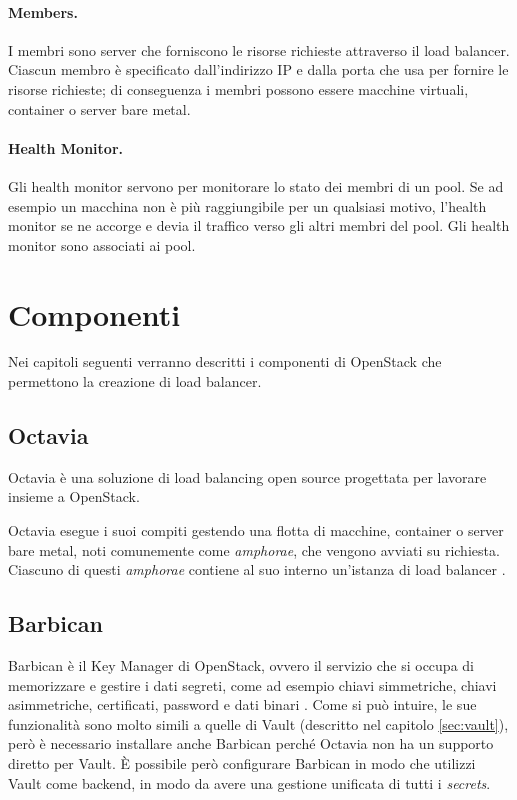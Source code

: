 \paragraph{Members.} I membri sono server che forniscono le risorse richieste attraverso il load balancer. Ciascun membro è specificato dall'indirizzo IP e dalla porta che usa per fornire le risorse richieste; di conseguenza i membri possono essere macchine virtuali, container o server bare metal.

\paragraph{Health Monitor.} Gli health monitor servono per monitorare lo stato dei membri di un pool. Se ad esempio un macchina non è più raggiungibile per un qualsiasi motivo, l'health monitor se ne accorge e devia il traffico verso gli altri membri del pool. Gli health monitor sono associati ai pool.

\section{Componenti}

Nei capitoli seguenti verranno descritti i componenti di OpenStack che permettono la creazione di load balancer.%

\subsection{Octavia}

Octavia è una soluzione di load balancing open source progettata per lavorare insieme a OpenStack.

Octavia esegue i suoi compiti gestendo una flotta di macchine, container o server bare metal, noti comunemente come \textit{amphorae}, che vengono avviati su richiesta. Ciascuno di questi \textit{amphorae} contiene al suo interno un'istanza di load balancer \cite{octavia_docs}.

\subsection{Barbican}

Barbican è il Key Manager di OpenStack, ovvero il servizio che si occupa di memorizzare e gestire i dati segreti, come ad esempio chiavi simmetriche, chiavi asimmetriche, certificati, password e dati binari \cite{barbican_docs}. Come si può intuire, le sue funzionalità sono molto simili a quelle di Vault (descritto nel capitolo \ref{sec:vault}), però è necessario installare anche Barbican perché Octavia non ha un supporto diretto per Vault. È possibile però configurare Barbican in modo che utilizzi Vault come backend, in modo da avere una gestione unificata di tutti i \textit{secrets}.



